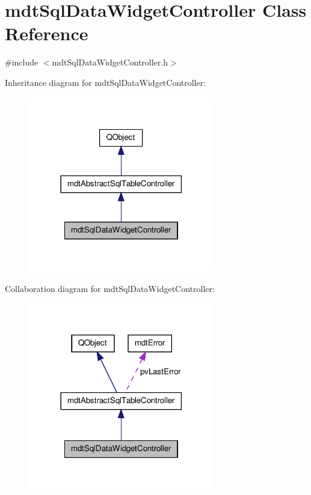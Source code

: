 \hypertarget{classmdt_sql_data_widget_controller}{\section{mdt\-Sql\-Data\-Widget\-Controller Class Reference}
\label{classmdt_sql_data_widget_controller}
}


{\ttfamily \#include $<$mdt\-Sql\-Data\-Widget\-Controller.\-h$>$}



Inheritance diagram for mdt\-Sql\-Data\-Widget\-Controller\-:\nopagebreak
\begin{figure}[H]
\begin{center}
\leavevmode
\includegraphics[width=230pt]{classmdt_sql_data_widget_controller__inherit__graph}
\end{center}
\end{figure}


Collaboration diagram for mdt\-Sql\-Data\-Widget\-Controller\-:\nopagebreak
\begin{figure}[H]
\begin{center}
\leavevmode
\includegraphics[width=230pt]{classmdt_sql_data_widget_controller__coll__graph}
\end{center}
\end{figure}
